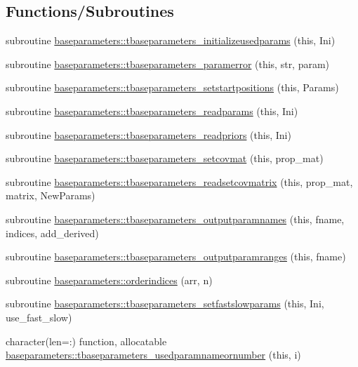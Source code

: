 \subsection*{Functions/\+Subroutines}
\begin{DoxyCompactItemize}
\item 
subroutine \mbox{\hyperlink{namespacebaseparameters_a86f36ece3b30fc7984f06ee4aad097bb}{baseparameters\+::tbaseparameters\+\_\+initializeusedparams}} (this, Ini)
\item 
subroutine \mbox{\hyperlink{namespacebaseparameters_a3126d9d902d7cc3f30105a9ad35e4a04}{baseparameters\+::tbaseparameters\+\_\+paramerror}} (this, str, param)
\item 
subroutine \mbox{\hyperlink{namespacebaseparameters_a1c41b4dbd4418bb1d16d77034504ac0b}{baseparameters\+::tbaseparameters\+\_\+setstartpositions}} (this, Params)
\item 
subroutine \mbox{\hyperlink{namespacebaseparameters_ae26154e8a07fc378e0e669659de1025a}{baseparameters\+::tbaseparameters\+\_\+readparams}} (this, Ini)
\item 
subroutine \mbox{\hyperlink{namespacebaseparameters_a810df98da76d4ae9691fb72eb588ea34}{baseparameters\+::tbaseparameters\+\_\+readpriors}} (this, Ini)
\item 
subroutine \mbox{\hyperlink{namespacebaseparameters_acc7b955531e3ac266fd197c8cc09ae50}{baseparameters\+::tbaseparameters\+\_\+setcovmat}} (this, prop\+\_\+mat)
\item 
subroutine \mbox{\hyperlink{namespacebaseparameters_a2d0a5594063e754beb3d8ef2b4af0522}{baseparameters\+::tbaseparameters\+\_\+readsetcovmatrix}} (this, prop\+\_\+mat, matrix, New\+Params)
\item 
subroutine \mbox{\hyperlink{namespacebaseparameters_a309e81ed0619c2b91456008b414cf5a9}{baseparameters\+::tbaseparameters\+\_\+outputparamnames}} (this, fname, indices, add\+\_\+derived)
\item 
subroutine \mbox{\hyperlink{namespacebaseparameters_a7deeecd73224be7473e92a6d48ba8909}{baseparameters\+::tbaseparameters\+\_\+outputparamranges}} (this, fname)
\item 
subroutine \mbox{\hyperlink{namespacebaseparameters_a7d00d4d42d3c3abcbdbc6078fffab95f}{baseparameters\+::orderindices}} (arr, n)
\item 
subroutine \mbox{\hyperlink{namespacebaseparameters_ac8f2cdce695f77b0f9cc3c2e86a9c05f}{baseparameters\+::tbaseparameters\+\_\+setfastslowparams}} (this, Ini, use\+\_\+fast\+\_\+slow)
\item 
character(len=\+:) function, allocatable \mbox{\hyperlink{namespacebaseparameters_a6fa6c72334203001f2e2932139df534d}{baseparameters\+::tbaseparameters\+\_\+usedparamnameornumber}} (this, i)
\end{DoxyCompactItemize}
